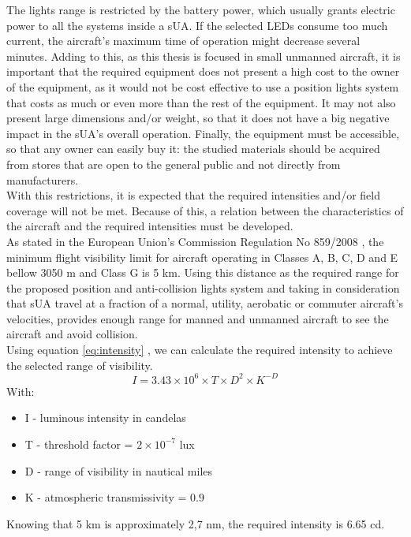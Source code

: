 The lights range is restricted by the battery power, which usually grants electric power to all the systems inside a sUA. If the selected LEDs consume too much current, the aircraft's maximum time of operation might decrease several minutes. Adding to this, as this thesis is focused in small unmanned aircraft, it is important that the required equipment does not present a high cost to the owner of the equipment, as it would not be cost effective to use a position lights system that costs as much or even more than the rest of the equipment. It may not also present large dimensions and/or weight, so that it does not have a big negative impact in the sUA's overall operation. Finally, the equipment must be accessible, so that any owner can easily buy it: the studied materials should be acquired from stores that are open to the general public and not directly from manufacturers.\\
With this restrictions, it is expected that the required intensities and/or field coverage \citep{Easa2012} will not be met. Because of this, a relation between the characteristics of the aircraft and the required intensities must be developed. \\

As stated in the European Union's Commission Regulation No 859/2008 \citep{EuropeanCommission2008}, the minimum flight visibility limit for aircraft operating in Classes A, B, C, D and E bellow 3050 m and Class G is 5 km. Using this distance as the required range for the proposed position and anti-collision lights system and taking in consideration that sUA travel at a fraction of a normal, utility, aerobatic or commuter aircraft's velocities, provides enough range for manned and unmanned aircraft to see the aircraft and avoid collision.\\
Using equation \ref{eq:intensity} \citep{UnitedStatesCoastGuard2011}, we can calculate the required intensity to achieve the selected range of visibility.\\
\begin{equation}\label{eq:intensity}
I = 3.43 \times 10^{6} \times T \times D^{2} \times K^{-D}
\end{equation}
With:
\begin{itemize}
\item I - luminous intensity in candelas
\item T - threshold factor = $2\times 10^{-7}$ lux
\item D - range of visibility in nautical miles
\item K - atmospheric transmissivity = $0.9$
\end{itemize}
Knowing that 5 km is approximately 2,7 nm, the required intensity is 6.65 cd.\\

